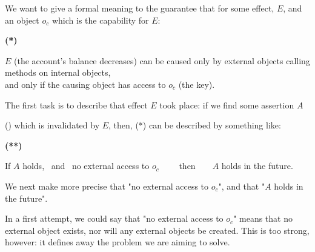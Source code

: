 {We want to give a formal meaning to the guarantee that for some effect, $E$, and an object $o_c$ which is the capability for $E$:

\vspace{.1cm}

  \begin{minipage}{.05\textwidth}
   \textbf{(*)}
\end{minipage}
\hfill
\begin{minipage}{.95\textwidth}
\begin{flushleft}
$E$  (\eg the account's balance decreases)  can be caused only  by external objects calling methods on internal objects, \\
and only if the causing object has access  to $o_c$ (\eg the key).
\end{flushleft}
\end{minipage}

\vspace{.1cm}


\noindent 
The first task is to describe that effect  $E$ took place: if we  find  some assertion $A$ {{()}
which is invalidated by $E$, then, (*) can be described by something like:

\vspace{.1cm}

  \begin{minipage}{.05\textwidth}
   \textbf{(**)}
\end{minipage}
\hfill
\begin{minipage}{.95\textwidth}
\begin{flushleft}
If $A$ holds, \  and \     no external access to  $o_c$ \ \ \ \ then\  \ \  \ $A$ holds in the future. 
\end{flushleft}
\end{minipage}

\vspace{.1cm}


\noindent 
We next make more precise that "no external access to  $o_c$", and that "$A$ holds in the future".

In a first attempt, we could say that "no external access to  $o_c$" means  that no external object exists, nor will any external objects be created.
This is too strong, however: it defines away the problem we are aiming to solve.

}}
